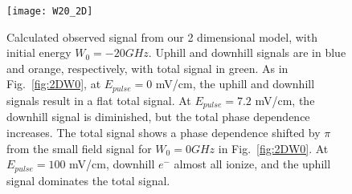 \documentclass[aps,pra,preprint,groupedaddress]{revtex4-1}
\begin{document}
\begin{figure}
	\texttt{[image: W20\_2D]}
	\caption{Calculated observed signal from our 2 dimensional model, with initial energy $W_0 = -20 GHz$. Uphill and downhill signals are in blue and orange, respectively, with total signal in green. As in Fig.~\ref{fig:2DW0}, at $E_{pulse} = 0$ mV/cm, the uphill and downhill signals result in a flat total signal. At $E_{pulse} = 7.2$ mV/cm, the downhill signal is diminished, but the total phase dependence increases. The total signal shows a phase dependence shifted by $\pi$ from the small field signal for $W_0 = 0 GHz$ in Fig.~\ref{fig:2DW0}. At $E_{pulse} = 100$ mV/cm, downhill $e^-$ almost all ionize, and the uphill signal dominates the total signal.}
	\label{fig:2DW20}
\end{figure}
\end{document}
